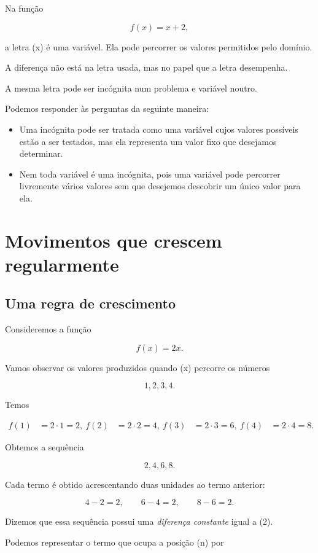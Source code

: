 \documentclass[12pt,a4paper]{article}
\begin{document}
Na função

\[
f(x)=x+2,
\]

a letra (x) é uma variável. Ela pode percorrer os valores permitidos
pelo domínio.

A diferença não está na letra usada, mas no papel que a letra
desempenha.

A mesma letra pode ser incógnita num problema e variável noutro.

Podemos responder às perguntas da seguinte maneira:

\begin{itemize}
\item Uma incógnita pode ser tratada como uma variável cujos valores
possíveis estão a ser testados, mas ela representa um valor fixo que
desejamos determinar.
\item Nem toda variável é uma incógnita, pois uma variável pode
percorrer livremente vários valores sem que desejemos descobrir um
único valor para ela.
\end{itemize}

\section{Movimentos que crescem regularmente}

\subsection{Uma regra de crescimento}

Consideremos a função

\[
f(x)=2x.
\]

Vamos observar os valores produzidos quando (x) percorre os números

\[
1,2,3,4.
\]

Temos

\[
\begin{aligned}
f(1)&=2\cdot1=2,\
f(2)&=2\cdot2=4,\
f(3)&=2\cdot3=6,\
f(4)&=2\cdot4=8.
\end{aligned}
\]

Obtemos a sequência

\[
2,4,6,8.
\]

Cada termo é obtido acrescentando duas unidades ao termo anterior:

\[
4-2=2,\qquad
6-4=2,\qquad
8-6=2.
\]

Dizemos que essa sequência possui uma \emph{diferença constante} igual
a (2).

Podemos representar o termo que ocupa a posição (n) por
\end{document}
